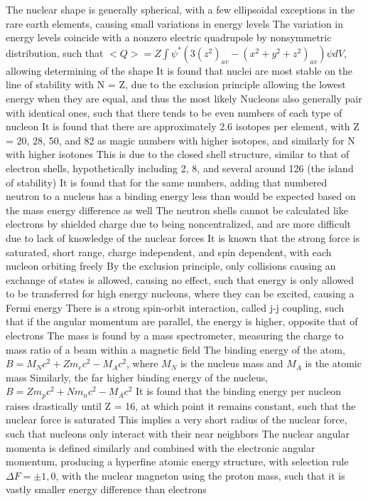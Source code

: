 \documentclass[11 pt, twoside]{article}
\newenvironment{outline*}
{
	\begin{outline}[enumerate]
	}
	{\end{outline}
}
\begin{document}
\begin{outline*}
\1 The nuclear shape is generally spherical, with a few ellipsoidal exceptions in the rare earth elements, causing small variations in energy levels
	\2 The variation in energy levels coincide with a nonzero electric quadrupole by nonsymmetric distribution, such that $<Q> = Z\int \psi^* (3(z^2)_{av} - (x^2 + y^2 + z^2)_{av})\psi dV$, allowing determining of the shape
\1 It is found that nuclei are most stable on the line of stability with N = Z, due to the exclusion principle allowing the lowest energy when they are equal, and thus the most likely
	\2 Nucleons also generally pair with identical ones, such that there tends to be even numbers of each type of nucleon
	\2 It is found that there are approximately 2.6 isotopes per element, with Z = 20, 28, 50, and 82 as magic numbers with higher isotopes, and similarly for N with higher isotones
		\3 This is due to the closed shell structure, similar to that of electron shells, hypothetically including 2, 8, and several around 126 (the island of stability)
		\3 It is found that for the same numbers, adding that numbered neutron to a nucleus has a binding energy less than would be expected based on the mass energy difference as well
		\3 The neutron shells cannot be calculated like electrons by shielded charge due to being noncentralized, and are more difficult due to lack of knowledge of the nuclear forces
			\4 It is known that the strong force is saturated, short range, charge independent, and spin dependent, with each nucleon orbiting freely
			\4 By the exclusion principle, only collisions causing an exchange of states is allowed, causing no effect, such that energy is only allowed to be transferred for high energy nucleons, where they can be excited, causing a Fermi energy
			\4 There is a strong spin-orbit interaction, called j-j coupling, such that if the angular momentum are parallel, the energy is higher, opposite that of electrons 
	\2 The mass is found by a mass spectrometer, measuring the charge to mass ratio of a beam within a magnetic field
\1 The binding energy of the atom, $B = M_Nc^2 + Zm_ec^2 - M_Ac^2$, where $M_N$ is the nucleus mass and $M_A$ is the atomic mass
	\2 Similarly, the far higher binding energy of the nucleus, $B = Zm_pc^2 + Nm_nc^2 - M_Ac^2$
	\2 It is found that the binding energy per nucleon raises drastically until Z = 16, at which point it remains constant, such that the nuclear force is saturated
		\3 This implies a very short radius of the nuclear force, such that nucleons only interact with their near neighbors
\1 The nuclear angular momenta is defined similarly and combined with the electronic angular momentum, producing a hyperfine atomic energy structure, with selection rule $\Delta F = \pm 1, 0$, with the nuclear magneton using the proton mass, such that it is vastly smaller energy difference than electrons

\end{outline*}
\end{document}
